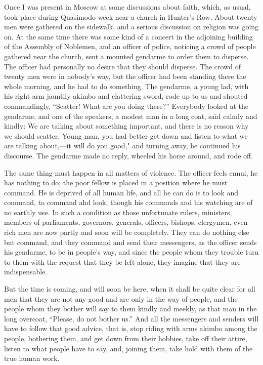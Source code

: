 \documentclass{book}
\begin{document}
Once I was present in Moscow at some discussions about faith, which, as usual, took place during Quasimodo week near a church in Hunter’s Row. About twenty men were gathered on the sidewalk, and a serious discussion on religion was going on. At the same time there was some kind of a concert in the adjoining building of the Assembly of Noblemen, and an officer of police, noticing a crowd of people gathered near the church, sent a mounted gendarme to order them to disperse. The officer had personally no desire that they should disperse. The crowd of twenty men were in nobody’s way, but the officer had been standing there the whole morning, and he had to do something. The gendarme, a young lad, with his right arm jauntily akimbo and clattering sword, rode up to us and shouted commandingly, “Scatter! What are you doing there?” Everybody looked at the gendarme, and one of the speakers, a modest man in a long coat, said calmly and kindly: We are talking about something important, and there is no reason why we should scatter. Young man, you had better get down and listen to what we are talking about,—it will do you good," and turning away, he continued his discourse. The gendarme made no reply, wheeled his horse around, and rode off.

The same thing must happen in all matters of violence. The officer feels ennui, he has nothing to do; the poor fellow is placed in a position where he must command. He is deprived of all human life, and all he can do is to look and command, to command ahd look, though his commands and his watching are of no earthly use. In such a condition as those unfortunate rulers, ministers, members of parliaments, governors, generals, officers, bishops, clergymen, even rich men are now partly and soon will be completely. They can do nothing else but command, and they command and send their messengers, as the officer sends his gendarme, to be in people’s way, and since the people whom they trouble turn to them with the request that they be left alone, they imagine that they are indispensable.

But the time is coming, and will soon be here, when it shall be quite clear for all men that they are not any good and are only in the way of people, and the people whom they bother will say to them kindly and meekly, as that man in the long overcoat, “Please, do not bother us.” And all the messengers and senders will have to follow that good advice, that is, stop riding with arms akimbo among the people, bothering them, and get down from their hobbies, take off their attire, listen to what people have to say, and, joining them, take hold with them of the true human work.
\end{document}
